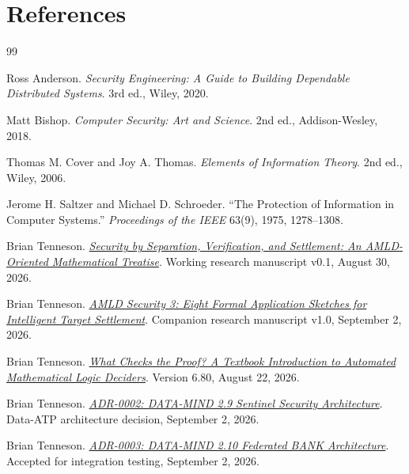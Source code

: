 \documentclass[11pt,oneside]{book}
\theoremstyle{definition}
\theoremstyle{remark}
\begin{document}
\backmatter
\chapter*{References}
\begin{thebibliography}{99}

Ross Anderson.
\newblock \emph{Security Engineering: A Guide to Building Dependable Distributed Systems}.
\newblock 3rd ed., Wiley, 2020.

Matt Bishop.
\newblock \emph{Computer Security: Art and Science}.
\newblock 2nd ed., Addison-Wesley, 2018.

Thomas M. Cover and Joy A. Thomas.
\newblock \emph{Elements of Information Theory}.
\newblock 2nd ed., Wiley, 2006.

Jerome H. Saltzer and Michael D. Schroeder.
\newblock ``The Protection of Information in Computer Systems.''
\newblock \emph{Proceedings of the IEEE} 63(9), 1975, 1278--1308.

Brian Tenneson.
\newblock \href{https://btenneson.github.io/pub/papers/amld_security_treatise_v0_1/}
{\emph{Security by Separation, Verification, and Settlement: An AMLD-Oriented Mathematical Treatise}}.
\newblock Working research manuscript v0.1, August 30, 2026.

Brian Tenneson.
\newblock \href{https://btenneson.github.io/pub/papers/amld_security_3/}
{\emph{AMLD Security 3: Eight Formal Application Sketches for Intelligent Target Settlement}}.
\newblock Companion research manuscript v1.0, September 2, 2026.

Brian Tenneson.
\newblock \href{https://btenneson.github.io/pub/papers/what_checks_the_proof_v6_80/}
{\emph{What Checks the Proof? A Textbook Introduction to Automated Mathematical Logic Deciders}}.
\newblock Version 6.80, August 22, 2026.

Brian Tenneson.
\newblock \href{https://github.com/btenneson/Data-ATP/blob/main/docs/architecture/ADR-0002-data-mind-2.9-sentinel.md}
{\emph{ADR-0002: DATA-MIND 2.9 Sentinel Security Architecture}}.
\newblock Data-ATP architecture decision, September 2, 2026.

Brian Tenneson.
\newblock \href{https://github.com/btenneson/Data-ATP/blob/main/docs/architecture/ADR-0003-data-mind-2.10-federated-bank.md}
{\emph{ADR-0003: DATA-MIND 2.10 Federated BANK Architecture}}.
\newblock Accepted for integration testing, September 2, 2026.


\end{thebibliography}
\end{document}
